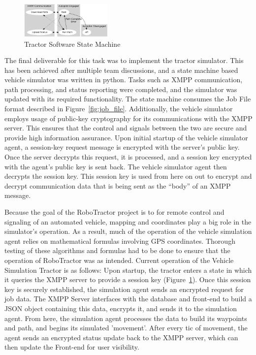 \documentclass[conference,12pt]{IEEEtran}
\begin{document}
\begin{figure}
\centering
\includegraphics[width=0.4\textwidth]{Images/machine.png}
\caption{Tractor Software State Machine}
\label{fig:tractorstatemachine}
\end{figure}
The final deliverable for this task was to implement the tractor simulator. This
has been achieved after multiple team discussions, and a state machine based
vehicle simulator was written in python. Tasks such as XMPP communication, path
processing, and status reporting were completed, and the simulator was updated
with its required functionality. The state machine consumes the Job File format
described in Figure~\ref{fig:job_file}. Additionally, the vehicle simulator
employs usage of public-key cryptography for its communications with the XMPP
server. This ensures that the control and signals between the two are secure and
provide high information assurance. Upon initial startup of the vehicle
simulator agent, a session-key request message is encrypted with the server's
public key. Once the server decrypts this request, it is processed, and
a session key encrypted with the agent's public key is sent back. The vehicle
simulator agent then decrypts the session key. This session key is used from
here on out to encrypt and decrypt communication data that is being sent as the
``body'' of an XMPP message. 

Because the goal of the RoboTractor project is to for remote control and
signaling of an automated vehicle, mapping and coordinates play a big role in
the simulator's operation. As a result, much of the operation of the vehicle
simulation agent relies on mathematical formulas involving GPS coordinates.
Thorough testing of these algorithms and formulas had to be done to ensure that
the operation of RoboTractor was as intended. Current operation of the Vehicle
Simulation Tractor is as follows: Upon startup, the tractor enters a state in
which it queries the XMPP server to provide a session key
(Figure~\ref{fig:tractorstatemachine}). Once this session key
is securely established, the simulation agent sends an encrypted request for job
data. The XMPP Server interfaces with the database and front-end to build a JSON
object containing this data, encrypts it, and sends it to the simulation agent.
From here, the simulation agent processes the data to build its waypoints and
path, and begins its simulated 'movement'. After every tic of movement, the
agent sends an encrypted status update back to the XMPP server, which can then
update the Front-end for user visibility. 
\end{document}
